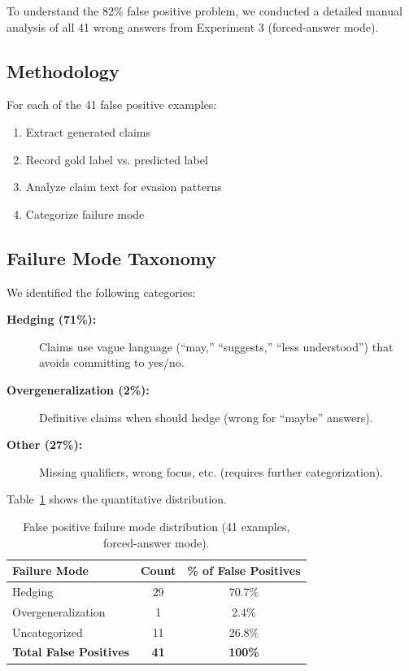 \documentclass[11pt]{article}
\begin{document}
To understand the 82\% false positive problem, we conducted a detailed manual analysis of all 41 wrong answers from Experiment 3 (forced-answer mode).

\subsection{Methodology}

For each of the 41 false positive examples:
\begin{enumerate}
\item Extract generated claims
\item Record gold label vs. predicted label
\item Analyze claim text for evasion patterns
\item Categorize failure mode
\end{enumerate}

\subsection{Failure Mode Taxonomy}

We identified the following categories:

\begin{description}
\item[\textbf{Hedging (71\%):}] Claims use vague language (``may,'' ``suggests,'' ``less understood'') that avoids committing to yes/no.
\item[\textbf{Overgeneralization (2\%):}] Definitive claims when should hedge (wrong for ``maybe'' answers).
\item[\textbf{Other (27\%):}] Missing qualifiers, wrong focus, etc. (requires further categorization).
\end{description}

Table~\ref{tab:failure_modes} shows the quantitative distribution.

\begin{table}[h]
\centering
\caption{False positive failure mode distribution (41 examples, forced-answer mode).}
\label{tab:failure_modes}
\begin{tabular}{lcc}
\toprule
\textbf{Failure Mode} & \textbf{Count} & \textbf{\% of False Positives} \\
\midrule
Hedging & 29 & 70.7\% \\
Overgeneralization & 1 & 2.4\% \\
Uncategorized & 11 & 26.8\% \\
\midrule
\textbf{Total False Positives} & \textbf{41} & \textbf{100\%} \\
\bottomrule
\end{tabular}
\end{table}
\end{document}
